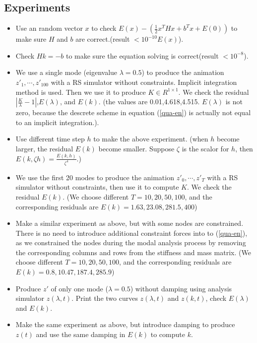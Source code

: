 \documentclass[twocolumn,a4paper]{article}
\begin{document}
\subsection{Experiments}
\begin{itemize}
\item Use an random vector $x$ to check $E(x)-(\frac{1}{2}x^THx+b^Tx+E(0))$ to
  make sure $H$ and $b$ are correct.({\color{red}result $<10^{-10}E(x)$}).
\item Check $Hk = -b$ to make sure the equation solving is
  correct({\color{red}result $<10^{-8}$}).
\item We use a single mode (eigenvalue $\lambda=0.5$) to produce the animation
  $z'_1,\cdots,z'_{100}$ with a RS simulator without constraints. Implicit
  integration method is used. Then we use it to produce $K\in R^{1\times1}$. We
  check the residual $|\frac{K}{\lambda}-1|$,$E(\lambda)$, and
  $E(k)$. ({\color{red}the values are 0.01,4.618,4.515. $E(\lambda)$ is not
    zero, because the descrete scheme in equation (\ref{qua-en}) is actually not
    equal to an implicit integration.}).
\item Use different time step $h$ to make the above
  experiment. ({\color{red}when $h$ become larger, the residual $E(k)$ become
    smaller. Suppose $\zeta$ is the scalor for $h$, then $E(k,\zeta h) =
    \frac{E(k,h)}{\zeta^4}$}.)
\item We use the first 20 modes to produce the animation $z'_0,\cdots,z'_{T}$
  with a RS simulator without constraints, then use it to compute $K$. We check
  the residual $E(k)$. ({\color{red}We choose different $T=10,20,50,100$, and
    the corresponding residuals are $E(k)=1.63,23.08,281.5,400$})
\item Make a similar experiment as above, but with some nodes are
  constrained. There is no need to introduce additional constraint forces into
  to (\ref{qua-en}), as we constrained the nodes during the modal analysis
  process by removing the corresponding columns and rows from the stiffness and
  mass matrix. ({\color{red}We choose different $T=10,20,50,100$, and
    the corresponding residuals are $E(k)=0.8,10.47,187.4,285.9$})
\item Produce $z'$ of only one mode ($\lambda = 0.5$) without damping using
  analysis simulator $z(\lambda,t)$. Print the two curves $z(\lambda,t)$ and
  $z(k,t)$, check $E(\lambda)$ and $E(k)$.
\item Make the same experiment as above, but introduce damping to produce $z(t)$
  and use the same damping in $E(k)$ to compute $k$.

\end{itemize}
\end{document}
